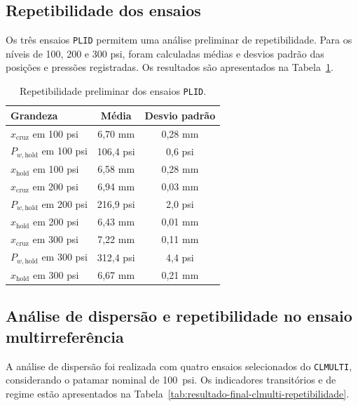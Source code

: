 \subsection{Repetibilidade dos ensaios}
\label{sec:resultado-final-repetibilidade}
Os três ensaios \texttt{PLID} permitem uma análise preliminar de repetibilidade. Para os níveis de 100, 200 e 300 psi, foram calculadas médias e desvios padrão das posições e pressões registradas. Os resultados são apresentados na Tabela~\ref{tab:resultado-final-repetibilidade-plid}.

\begin{table}[htbp]
    \centering
    \caption{Repetibilidade preliminar dos ensaios \texttt{PLID}.}
    \label{tab:resultado-final-repetibilidade-plid}
    \begin{tabular}{l c c}
        \toprule
        Grandeza & Média & Desvio padrão \\
        \midrule
        $x_{\mathrm{cruz}}$ em 100 psi & 6,70 mm & 0,28 mm \\
        $P_{w,\mathrm{hold}}$ em 100 psi & 106,4 psi & 0,6 psi \\
        $x_{\mathrm{hold}}$ em 100 psi & 6,58 mm & 0,28 mm \\
        $x_{\mathrm{cruz}}$ em 200 psi & 6,94 mm & 0,03 mm \\
        $P_{w,\mathrm{hold}}$ em 200 psi & 216,9 psi & 2,0 psi \\
        $x_{\mathrm{hold}}$ em 200 psi & 6,43 mm & 0,01 mm \\
        $x_{\mathrm{cruz}}$ em 300 psi & 7,22 mm & 0,11 mm \\
        $P_{w,\mathrm{hold}}$ em 300 psi & 312,4 psi & 4,4 psi \\
        $x_{\mathrm{hold}}$ em 300 psi & 6,67 mm & 0,21 mm \\
        \bottomrule
    \end{tabular}
\end{table}

\subsection{Análise de dispersão e repetibilidade no ensaio multirreferência}
\label{sec:resultado-final-clmulti-dispersao}

A análise de dispersão foi realizada com quatro ensaios selecionados do \texttt{CLMULTI}, considerando o patamar nominal de 100~psi. Os indicadores transitórios e de regime estão apresentados na Tabela~\ref{tab:resultado-final-clmulti-repetibilidade}.


